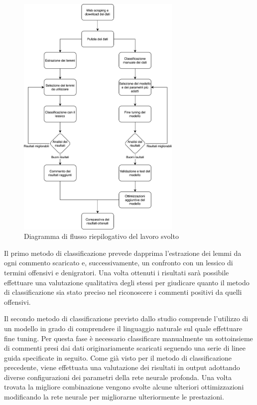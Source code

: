 \begin{figure}[h!]
    \centering
    \includegraphics[width=0.7\textwidth]{pics/diagrams/flowchart thesis.png}
    \caption{Diagramma di flusso riepilogativo del lavoro svolto}
    \label{fig:diag1}
\end{figure}


Il primo metodo di classificazione prevede dapprima l'estrazione dei lemmi da ogni commento scaricato e, successivamente, un confronto con un lessico di termini offensivi e denigratori. Una volta ottenuti i risultati sarà possibile effettuare una valutazione qualitativa degli stessi per giudicare quanto il metodo di classificazione sia stato preciso nel riconoscere i commenti positivi da quelli offensivi.

Il secondo metodo di classificazione previsto dallo studio comprende l'utilizzo di un modello in grado di comprendere il linguaggio naturale sul quale effettuare fine tuning. Per questa fase è necessario classificare manualmente un sottoinsieme di commenti presi dai dati originariamente scaricati seguendo una serie di linee guida specificate in seguito. Come già visto per il metodo di classificazione precedente, viene effettuata una valutazione dei risultati in output adottando diverse configurazioni dei parametri della rete neurale profonda. Una volta trovata la migliore combinazione vengono svolte alcune ulteriori ottimizzazioni modificando la rete neurale per migliorarne ulteriormente le prestazioni. 

